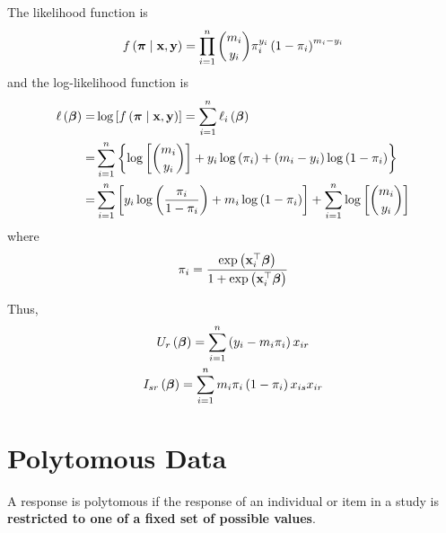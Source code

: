 The likelihood function is
\begin{equation}
	f\left(\boldsymbol{\pi}\mid{\bf x},\mathbf{y}\right)=\prod_{i=1}^{n}\binom{m_{i}}{y_{i}}\pi_{i}^{y_{i}}\left(1-\pi_{i}\right)^{m_{i}-y_{i}}
\end{equation}
and the log-likelihood function is
\begin{equation}
	\begin{aligned}
		\ell\left(\boldsymbol{\beta}\right)= & \log\left[f\left(\boldsymbol{\pi}\mid{\bf x},\mathbf{y}\right)\right]=\sum_{i=1}^{n}\ell_{i}\left(\boldsymbol{\beta}\right)                                                  \\
		=                         & \sum_{i=1}^{n}\left\{\log\left[\binom{m_{i}}{y_{i}}\right]+y_{i}\log\left(\pi_{i}\right)+\left(m_{i}-y_{i}\right)\log\left(1-\pi_{i}\right)\right\}            \\
		=                         & \sum_{i=1}^{n}\left[y_{i}\log\left(\frac{\pi_{i}}{1-\pi_{i}}\right)+m_{i}\log\left(1-\pi_{i}\right)\right]+\sum_{i=1}^{n}\log\left[\binom{m_{i}}{y_{i}}\right]
	\end{aligned}
\end{equation}
where
\begin{equation}
	\pi_{i}=\frac{\exp\left({\bf x}_{i}^{\top}\boldsymbol{\beta}\right)}{1+\exp\left({\bf x}_{i}^{\top}\boldsymbol{\beta}\right)}
\end{equation}

Thus,
\begin{gather*}
	U_{r}\left(\boldsymbol{\beta}\right)=\sum_{i=1}^{n}\left(y_{i}-m_{i}\pi_{i}\right)x_{ir} \\
	I_{sr}\left(\boldsymbol{\beta}\right)=\sum_{i=1}^{n}m_{i}\pi_{i}\left(1-\pi_{i}\right)x_{is}x_{ir}
\end{gather*}

\section{Polytomous Data}

\begin{definition}
	A response is polytomous if the response of an individual or item in a study is \textbf{restricted to one of a fixed set of possible values}.
\end{definition}

